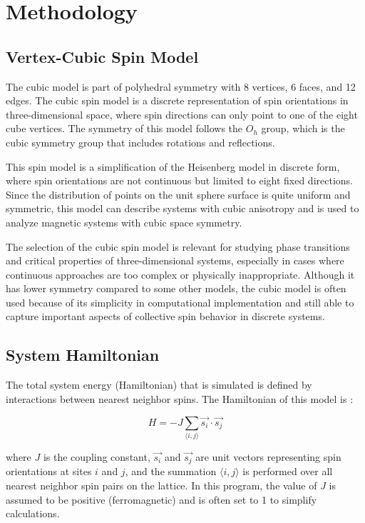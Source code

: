 \section{Methodology}

\subsection{Vertex-Cubic Spin Model}

The cubic model is part of polyhedral symmetry with 8 vertices, 6 faces, and 12 edges. The cubic spin model is a discrete representation of spin orientations in three-dimensional space, where spin directions can only point to one of the eight cube vertices. The symmetry of this model follows the $O_h$ group, which is the cubic symmetry group that includes rotations and reflections.

This spin model is a simplification of the Heisenberg model in discrete form, where spin orientations are not continuous but limited to eight fixed directions. Since the distribution of points on the unit sphere surface is quite uniform and symmetric, this model can describe systems with cubic anisotropy and is used to analyze magnetic systems with cubic space symmetry.

The selection of the cubic spin model is relevant for studying phase transitions and critical properties of three-dimensional systems, especially in cases where continuous approaches are too complex or physically inappropriate. Although it has lower symmetry compared to some other models, the cubic model is often used because of its simplicity in computational implementation and still able to capture important aspects of collective spin behavior in discrete systems.

\subsection{System Hamiltonian}

The total system energy (Hamiltonian) that is simulated is defined by interactions between nearest neighbor spins. The Hamiltonian of this model is \cite{Yunita2022}:

\begin{equation}
H = -J \sum_{\langle i,j \rangle} \vec{s_i} \cdot \vec{s_j}
\label{eq:hamiltonian}
\end{equation}

where $J$ is the coupling constant, $\vec{s_i}$ and $\vec{s_j}$ are unit vectors representing spin orientations at sites $i$ and $j$, and the summation $\langle i,j \rangle$ is performed over all nearest neighbor spin pairs on the lattice. In this program, the value of $J$ is assumed to be positive (ferromagnetic) and is often set to 1 to simplify calculations.

